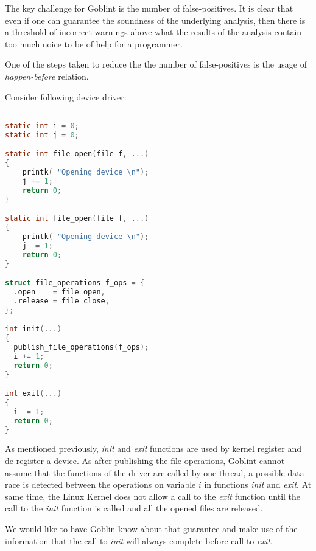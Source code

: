 \documentclass[..thesis.tex]{subfiles}
\begin{document}

The key challenge for Goblint is the number of false-positives. It is clear that even if one can guarantee the soundness of the 
underlying analysis, then there is a threshold of incorrect warnings above what the results of the analysis contain too much noice
to be of help for a programmer.


One of the steps taken to reduce the the number of false-positives is the usage of \textit{happen-before} relation.


Consider following device driver:

\begin{lstlisting}[language=c,style=def]

static int i = 0;
static int j = 0;

static int file_open(file f, ...)
{
    printk( "Opening device \n");
    j += 1;
    return 0;
}

static int file_open(file f, ...)
{
    printk( "Opening device \n");
    j -= 1;
    return 0;
}

struct file_operations f_ops = {
  .open    = file_open,
  .release = file_close,
};

int init(...)
{
  publish_file_operations(f_ops);
  i += 1;
  return 0;
}

int exit(...)
{
  i -= 1;
  return 0;
}

\end{lstlisting}

As mentioned previously, \textit{init} and \textit{exit} functions are used by kernel register and de-register a device. As after publishing the file operations, Goblint cannot assume that the functions of the driver are called by one thread, a possible data-race is detected between the operations on variable $i$ in functions \textit{init} and \textit{exit}. At same time, the Linux Kernel does not allow a call to the \textit{exit} function until the call to the \textit{init} function is called and all the opened files are released.

We would like to have Goblin know about that guarantee and make use of the information that the call to \textit{init} will always complete before call to \textit{exit}.

\end{document}
